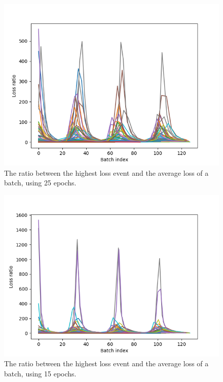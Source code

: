 \begin{figure}
	\begin{center}
		\includegraphics[scale=0.1]{experiments/epochs/25-epochs.png}
	\end{center}
	\caption{The ratio between the highest loss event and the average loss of a batch, using 25 epochs.~\label{fig:25-epochs}}
\end{figure}


\begin{figure}
	\begin{center}
		\includegraphics[scale=0.1]{experiments/epochs/15-epochs}
	\end{center}
	\caption{The ratio between the highest loss event and the average loss of a batch, using 15 epochs.~\label{fig:15-epochs}}
\end{figure}


